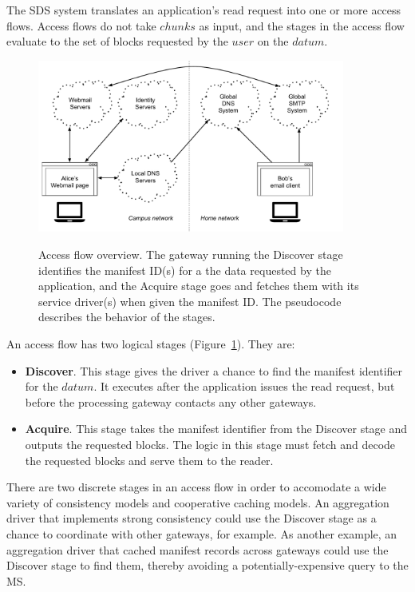 The SDS system translates an application's read request into one or more access
flows.  Access flows do not take $chunks$ as input, and the stages in the access
flow evaluate to the set of blocks requested by the $user$ on the $datum$.

\begin{figure}[h]
   \caption{Access flow overview.  The gateway running the Discover stage
   identifies the manifest ID(s) for a the data requested by the application,
   and the Acquire stage goes and fetches them with its service driver(s)
   when given the manifest ID.  The pseudocode describes the behavior of the
   stages.}
   \centering
   \includegraphics[width=0.9\textwidth,page=7]{figures/dissertation-figures}
   \label{fig:chap2-access-flow}
\end{figure}

An access flow has two logical stages (Figure~\ref{fig:chap2-access-flow}).  They are:

\begin{itemize}
    \item \textbf{Discover}.  This stage gives the driver a chance to find the
manifest identifier for the $datum$.  It executes after the application issues
the read request, but before the processing gateway contacts any other gateways.
    \item \textbf{Acquire}.  This stage takes the manifest identifier from the
Discover stage and outputs the requested blocks.  The logic in this 
stage must fetch and decode the requested blocks and serve them to the reader.
\end{itemize}

There are two discrete stages in an access flow in order to accomodate a wide
variety of consistency models and cooperative caching models.  An
aggregation driver that implements strong consistency could use the Discover
stage as a chance to coordinate with other gateways, for example.  As
another example, an aggregation driver that cached manifest records
across gateways could use the Discover stage to find them, thereby avoiding a
potentially-expensive query to the MS.

